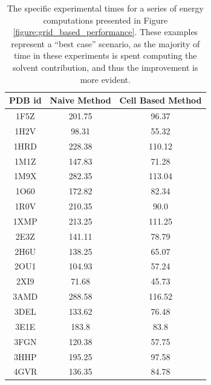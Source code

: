 \begin{table}[H]
\centering
\label{table:energy_timings}
\begin{tabular}{|c|c|c|}
\hline
PDB id	& Naive Method	& Cell Based Method	\\
\hline
1F5Z	&  201.75	&  96.37	\\
1H2V	&  98.31	&  55.32	\\
1HRD	&  228.38	&  110.12	\\
1M1Z	&  147.83	&  71.28	\\
1M9X	&  282.35	&  113.04	\\
1O60	&  172.82	&  82.34	\\
1R0V	&  210.35	&  90.0  \\
1XMP	&  213.25	&  111.25	\\
2E3Z	&  141.11	&  78.79	\\
2H6U	&  138.25	&  65.07	\\
2OU1	&  104.93	&  57.24	\\
2XI9	&  71.68	&  45.73	\\
3AMD	&  288.58	&  116.52	\\
3DEL	&  133.62	&  76.48	\\
3E1E	&  183.8	&  83.8	\\
3FGN	&  120.38	&  57.75	\\
3HHP	&  195.25	&  97.58	\\
4GVR	&  136.35	&  84.78	\\
\hline
\end{tabular}
\caption{The specific experimental times for a series of energy computations presented in Figure \ref{figure:grid_based_performance}.
These examples represent a ``best case'' scenario, as the majority of time in these experiments is spent computing the solvent contribution, and thus the improvement is more evident.}
\end{table}



